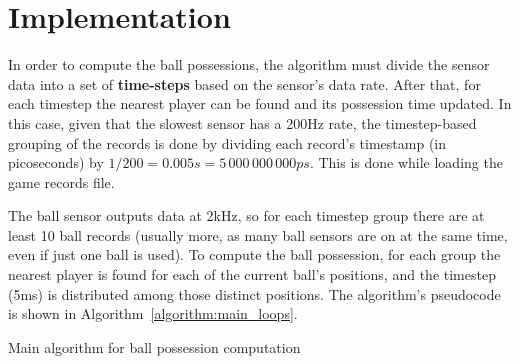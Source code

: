 \documentclass[a4paper, 10pt]{article}
\begin{document}
\section*{Implementation}

In order to compute the ball possessions, the algorithm must divide the sensor data into a set of {\bf time-steps} based on the sensor's data rate.
After that, for each timestep the nearest player can be found and its possession time updated.
In this case, given that the slowest sensor has a 200Hz rate, the timestep-based grouping of the records is done by dividing each record's timestamp (in picoseconds) by $1 / 200 = 0.005s = 5\,000\,000\,000ps$.
This is done while loading the game records file.


The ball sensor outputs data at 2kHz, so for each timestep group there are at least 10 ball records (usually more, as many ball sensors are on at the same time, even if just one ball is used).
To compute the ball possession, for each group the nearest player is found for each of the current ball's positions, and the timestep (5ms) is distributed among those distinct positions.
The algorithm's pseudocode is shown in Algorithm~\ref{algorithm:main_loops}.

\begin{algorithm}[tb]

    \BlankLine
    \caption{Main algorithm for ball possession computation}
    \label{algorithm:main_loops}
\end{algorithm}
\end{document}
